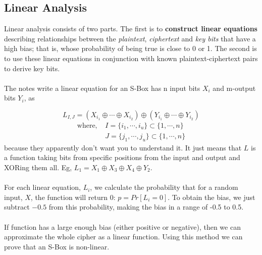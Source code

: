     \subsection{Linear Analysis}
        Linear analysis consists of two parts. The first is to \textbf{construct linear equations} describing relationships between the \textit{plaintext}, \textit{ciphertext} and \textit{key bits} that have a high bias; that is, whose probability of being true is close to 0 or 1.  The second is to use these linear equations in conjunction with known plaintext-ciphertext pairs to derive key bits.\\
        \\
        The notes write a linear equation for an S-Box has n input bits $X_i$ and m-output bits $Y_i$, as

        \begin{equation}
            L_{I,J} = (X_{i_1} \oplus \cdots \oplus X_{i_2}) \oplus (Y_{i_1} \oplus \cdots \oplus Y_{i_2})
        \end{equation}
        \begin{align*}
            \text{where, } & I = \{i_1, \cdots ,i_u\} \subset \{1, \cdots ,n\}\\
            & J = \{j_1, \cdots ,j_u\} \subset \{1, \cdots ,n\}
        \end{align*}
        because they apparently don't want you to understand it. It just means that $L$ is a function taking bits from specific positions from the input and output and XORing them all. Eg, $L_1 = X_1 \oplus X_3 \oplus X_4 \oplus Y_2$.\\
        \\
        For each linear equation, $L_i$, we calculate the probability that for a random input, $X$, the function will return 0: $p=Pr[L_i=0]$. To obtain the bias, we just subtract $-0.5$ from this probability, making the bias in a range of -0.5 to 0.5.\\
        \\
        If function has a large enough bias (either positive or negative), then we can approximate the whole cipher as a linear function. Using this method we can prove that an S-Box is non-linear.

